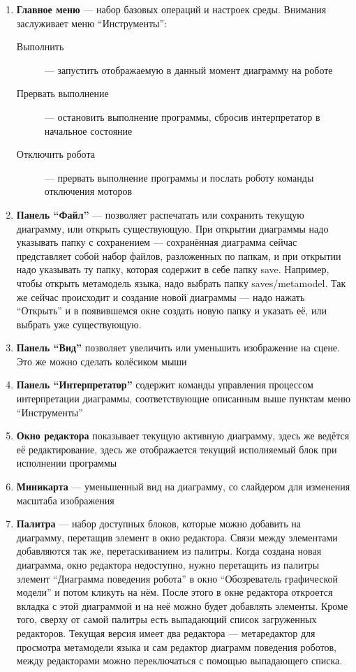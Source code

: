 \documentclass[a4paper,12pt,twoside]{article}
\begin{document}
\pagebreak

\begin{enumerate}
	\item \textbf{Главное меню} --- набор базовых операций и настроек среды. Внимания заслуживает меню "`Инструменты"': 
    \begin{description}
      \item[Выполнить] --- запустить отображаемую в данный момент диаграмму на роботе
      \item[Прервать выполнение] --- остановить выполнение программы, сбросив интерпретатор в начальное состояние
      \item[Отключить робота] --- прервать выполнение программы и послать роботу команды отключения моторов
    \end{description}
  \item \textbf{Панель "`Файл"'} --- позволяет распечатать или сохранить текущую диаграмму, или открыть существующую. При открытии диаграммы надо указывать папку с сохранением --- сохранённая диаграмма сейчас представляет собой набор файлов, разложенных по папкам, и при открытии надо указывать ту папку, которая содержит в себе папку save. Например, чтобы открыть метамодель языка, надо выбрать папку saves/metamodel. Так же сейчас происходит и создание новой диаграммы --- надо нажать "`Открыть"' и в появившемся окне создать новую папку и указать её, или выбрать уже существующую.
  \item \textbf{Панель "`Вид"'} позволяет увеличить или уменьшить изображение на сцене. Это же можно сделать колёсиком мыши
  \item \textbf{Панель "`Интерпретатор"'} содержит команды управления процессом интерпретации диаграммы, соответствующие описанным выше пунктам меню "`Инструменты"'
  \item \textbf{Окно редактора} показывает текущую активную диаграмму, здесь же ведётся её редактирование, здесь же отображается текущий исполняемый блок при исполнении программы
  \item \textbf{Миникарта} --- уменьшенный вид на диаграмму, со слайдером для изменения масштаба изображения
  \item \textbf{Палитра} --- набор доступных блоков, которые можно добавить на диаграмму, перетащив элемент в окно редактора. Связи между элементами добавляются так же, перетаскиванием из палитры. Когда создана новая диаграмма, окно редактора недоступно, нужно перетащить из палитры элемент "`Диаграмма поведения робота"' в окно "`Обозреватель графической модели"' и потом кликуть на нём. После этого в окне редактора откроется вкладка с этой диаграммой и на неё можно будет добавлять элементы. Кроме того, сверху от самой палитры есть выпадающий список загруженных редакторов. Текущая версия имеет два редактора --- метаредактор для просмотра метамодели языка и сам редактор диаграмм поведения роботов, между редакторами можно переключаться с помощью выпадающего списка.

\end{enumerate}
\end{document}
